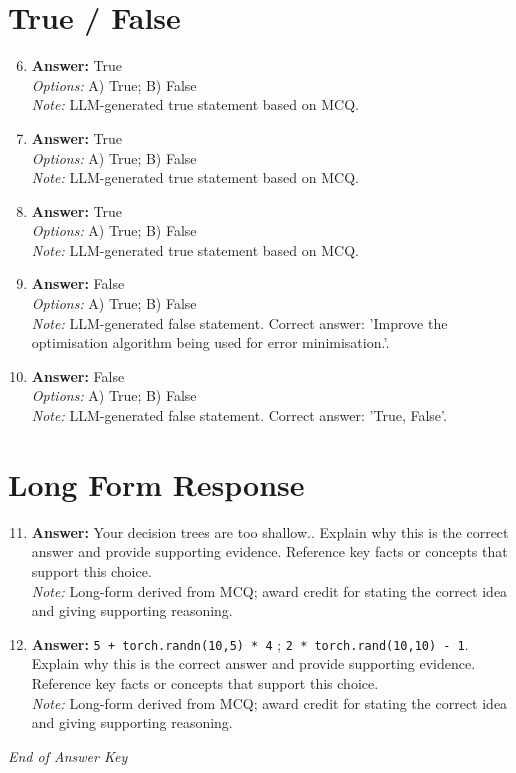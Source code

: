 \documentclass[12pt]{article}
\begin{document}
\section*{True / False}
\begin{enumerate}[label=\arabic*.]
\setcounter{enumi}{5}
\item \textbf{Answer:} True
\\ \textit{Options:} A) True; B) False
\\ \textit{Note:} LLM-generated true statement based on MCQ.
\item \textbf{Answer:} True
\\ \textit{Options:} A) True; B) False
\\ \textit{Note:} LLM-generated true statement based on MCQ.
\item \textbf{Answer:} True
\\ \textit{Options:} A) True; B) False
\\ \textit{Note:} LLM-generated true statement based on MCQ.
\item \textbf{Answer:} False
\\ \textit{Options:} A) True; B) False
\\ \textit{Note:} LLM-generated false statement. Correct answer: 'Improve the optimisation algorithm being used for error minimisation.'.
\item \textbf{Answer:} False
\\ \textit{Options:} A) True; B) False
\\ \textit{Note:} LLM-generated false statement. Correct answer: 'True, False'.
\end{enumerate}

\section*{Long Form Response}
\begin{enumerate}[label=\arabic*.]
\setcounter{enumi}{10}
\item \textbf{Answer:} Your decision trees are too shallow.. Explain why this is the correct answer and provide supporting evidence. Reference key facts or concepts that support this choice.
\\ \textit{Note:} Long-form derived from MCQ; award credit for stating the correct idea and giving supporting reasoning.
\item \textbf{Answer:} \texttt{5 + torch.randn(10,5) * 4} ; \texttt{2 * torch.rand(10,10) - 1}. Explain why this is the correct answer and provide supporting evidence. Reference key facts or concepts that support this choice.
\\ \textit{Note:} Long-form derived from MCQ; award credit for stating the correct idea and giving supporting reasoning.
\end{enumerate}

\vfill
\noindent\textit{End of Answer Key}
\end{document}
